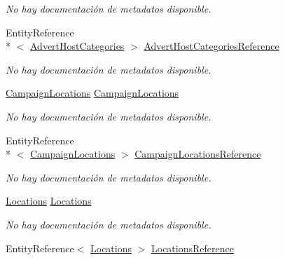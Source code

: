 \begin{DoxyCompactItemize}
\begin{DoxyCompactList}\small\item\em No hay documentación de metadatos disponible. \end{DoxyCompactList}\item 
Entity\-Reference\\*
$<$ \hyperlink{class_game_memory_1_1_advert_host_categories}{Advert\-Host\-Categories} $>$ \hyperlink{class_game_memory_1_1_advert_hosts_a90144e6cd1a7c13e64a210d9fb84bb30}{Advert\-Host\-Categories\-Reference}
\begin{DoxyCompactList}\small\item\em No hay documentación de metadatos disponible. \end{DoxyCompactList}\item 
\hyperlink{class_game_memory_1_1_campaign_locations}{Campaign\-Locations} \hyperlink{class_game_memory_1_1_advert_hosts_ab5cafcddf70eae65c6848c168af5a4e5}{Campaign\-Locations}
\begin{DoxyCompactList}\small\item\em No hay documentación de metadatos disponible. \end{DoxyCompactList}\item 
Entity\-Reference\\*
$<$ \hyperlink{class_game_memory_1_1_campaign_locations}{Campaign\-Locations} $>$ \hyperlink{class_game_memory_1_1_advert_hosts_adde1f5e205d40e2b0893edd68382747a}{Campaign\-Locations\-Reference}
\begin{DoxyCompactList}\small\item\em No hay documentación de metadatos disponible. \end{DoxyCompactList}\item 
\hyperlink{class_game_memory_1_1_locations}{Locations} \hyperlink{class_game_memory_1_1_advert_hosts_aecffc47c6b7f5efa56310dda35ef0924}{Locations}
\begin{DoxyCompactList}\small\item\em No hay documentación de metadatos disponible. \end{DoxyCompactList}\item 
Entity\-Reference$<$ \hyperlink{class_game_memory_1_1_locations}{Locations} $>$ \hyperlink{class_game_memory_1_1_advert_hosts_a718933a989867b5853054036455233f3}{Locations\-Reference}

\end{DoxyCompactItemize}
